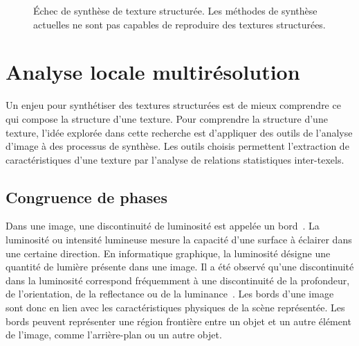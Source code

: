 \begin{figure}
    \caption[Échec de synthèse de texture structurée]{Échec de synthèse de texture structurée. Les méthodes de synthèse actuelles ne sont pas capables de reproduire des textures structurées.}
    \label{fig:synthesis-failure}
\end{figure}

\section{Analyse locale multirésolution}

Un enjeu pour synthétiser des textures structurées est de mieux comprendre ce qui compose la structure d'une texture. Pour comprendre la structure d'une texture, l'idée explorée dans cette recherche est d'appliquer des outils de l'analyse d'image à des processus de synthèse. Les outils choisis permettent l'extraction de caractéristiques d'une texture par l'analyse de relations statistiques inter-texels.

\subsection*{Congruence de phases}

Dans une image, une discontinuité de luminosité est appelée un bord~\cite{torre_edge_1986}. La luminosité ou intensité lumineuse mesure la capacité d'une surface à éclairer dans une certaine direction. En informatique graphique, la luminosité désigne une quantité de lumière présente dans une image. Il a été observé qu'une discontinuité dans la luminosité correspond fréquemment à une discontinuité de la profondeur, de l'orientation, de la reflectance ou de la luminance~\cite{lindeberg_edge_1998}. Les bords d'une image sont donc en lien avec les caractéristiques physiques de la scène représentée. Les bords peuvent représenter une région frontière entre un objet et un autre élément de l'image, comme l'arrière-plan ou un autre objet.

\bigskip

